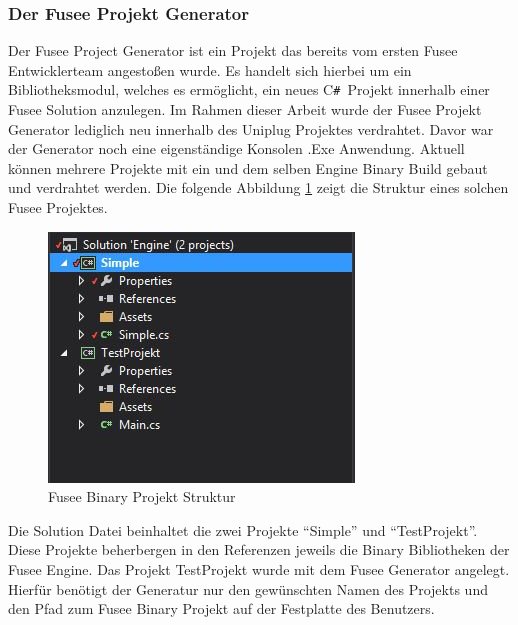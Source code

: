 \documentclass[pagesize, paper=a4, fontsize=12pt, titlepage=true, headings=small, headnosepline, abstractoff, liststotoc, nochapterprefix, plainheadsepline, twoside]{scrreprt}
\newcommand{\CSS}{C\texttt{\# }}
\begin{document}
\subsubsection{Der Fusee Projekt Generator}
Der Fusee Project Generator ist ein Projekt das bereits vom ersten Fusee Entwicklerteam angestoßen wurde. Es  handelt sich hierbei um ein Bibliotheksmodul, welches es ermöglicht, ein neues \CSS Projekt innerhalb einer Fusee Solution anzulegen. Im Rahmen dieser Arbeit wurde der Fusee Projekt Generator lediglich neu innerhalb des Uniplug Projektes verdrahtet. Davor war der Generator noch eine eigenständige Konsolen .Exe Anwendung. Aktuell können mehrere Projekte mit ein und dem selben Engine Binary Build gebaut und verdrahtet werden. Die folgende Abbildung \ref{FuseeBinaryProjektStruktur} zeigt die Struktur eines solchen Fusee Projektes.
\begin{figure}[ht]
	\centering
	\includegraphics[width=\linewidth/2]{Bilder/FuseeBinaryProjekt.jpg}
	\caption{Fusee Binary Projekt Struktur}
	\label{FuseeBinaryProjektStruktur}
\end{figure}
Die Solution Datei beinhaltet die zwei Projekte “Simple” und “TestProjekt”. Diese Projekte beherbergen in den Referenzen jeweils die Binary Bibliotheken der Fusee Engine. Das Projekt TestProjekt wurde mit dem Fusee Generator angelegt. Hierfür benötigt der Generatur nur den gewünschten Namen des Projekts und den Pfad zum Fusee Binary Projekt auf der Festplatte des Benutzers.
\end{document}

